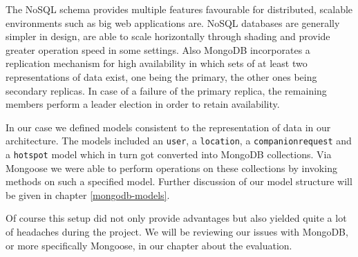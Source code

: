 The NoSQL schema provides multiple features favourable for distributed, scalable environments such as big web applications are. NoSQL databases are generally simpler in design, are able to scale horizontally through shading and provide greater operation speed in some settings. Also MongoDB incorporates a replication mechanism for high availability in which sets of at least two representations of data exist, one being the primary, the other ones being secondary replicas. In case of a failure of the primary replica, the remaining members perform a leader election in order to retain availability.

In our case we defined models consistent to the representation of data in our architecture. The models included an \texttt{user}, a \texttt{location}, a \texttt{companionrequest} and a \texttt{hotspot} model which in turn got converted into MongoDB collections. Via Mongoose we were able to perform operations on these collections by invoking methods on such a specified model. Further discussion of our model structure will be given in chapter \ref{mongodb-models}.

Of course this setup did not only provide advantages but also yielded quite a lot of headaches during the project. We will be reviewing our issues with MongoDB, or more specifically Mongoose, in our chapter about the evaluation.
